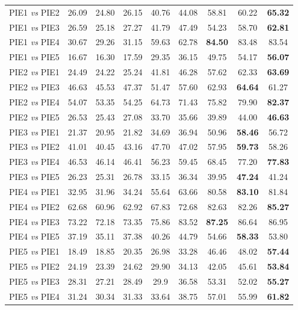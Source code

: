 \documentclass[10pt,twocolumn,letterpaper]{article}
\begin{document}
\begin{CJK*}{UTF8}{gkai}
\begin{table}[h!]
{\begin{tabular}{|l |c |c |c| c |c |c | c| c|}
			\vspace{1pt}  
			
			PIE1 \emph{vs} PIE2&  26.09&	24.80&	26.15&	40.76&	44.08&	58.81&	60.22&	\textbf{ 65.32}
			\\
			PIE1 \emph{vs} PIE3&  26.59&	25.18&	27.27&	41.79&	47.49&	54.23&	58.70&  \textbf{   62.81}
			\\
			PIE1 \emph{vs} PIE4 & 30.67&29.26&	31.15&	59.63&	62.78&\textbf{84.50}& 83.48& 83.54
			\\
			PIE1 \emph{vs} PIE5&   16.67&	16.30&	17.59&	29.35&	36.15&	49.75&	54.17&	\textbf{ 56.07}
			\\
			PIE2 \emph{vs} PIE1&   24.49&	24.22&	25.24&	41.81&	46.28&	57.62&	62.33&	\textbf{ 63.69}
			\\
			PIE2 \emph{vs} PIE3&   46.63&	45.53&	47.37&	51.47&	57.60&	62.93&	\textbf{ 64.64}&	61.27
			\\
			PIE2 \emph{vs} PIE4&   54.07&	53.35&	54.25&	64.73&	71.43&	75.82&	79.90	&\textbf{ 82.37}
			\\
			PIE2 \emph{vs} PIE5&   26.53&	25.43&	27.08&	33.70&	35.66&	39.89&	44.00&	\textbf{ 46.63}
			\\
			PIE3 \emph{vs} PIE1&   21.37&	20.95&	21.82&	34.69&	36.94&	50.96&	\textbf{ 58.46}&	56.72
			\\
			PIE3 \emph{vs} PIE2&   41.01&	40.45&	43.16&	47.70&	47.02&	57.95&	\textbf{ 59.73}&	58.26
			\\
			PIE3 \emph{vs} PIE4&   46.53&	46.14&	46.41&	56.23&	59.45&	68.45&	77.20&	\textbf{ 77.83}
			\\
			PIE3 \emph{vs} PIE5&   26.23&	25.31&	26.78&	33.15&	36.34&	39.95&	\textbf{ 47.24}&	41.24
			\\
			PIE4 \emph{vs} PIE1&   32.95&	31.96&	34.24&	55.64&	63.66&	80.58&	\textbf{ 83.10}&	81.84
			\\
			PIE4 \emph{vs} PIE2&  62.68&	60.96&	62.92&	67.83&	72.68&	82.63&	82.26&	\textbf{ 85.27}
			\\
			PIE4 \emph{vs} PIE3&   73.22&	72.18&	73.35&	75.86&	83.52&	\textbf{87.25}&	86.64&	86.95
			\\
			PIE4 \emph{vs} PIE5&   37.19&	35.11&	37.38&	40.26&	44.79&	54.66&	\textbf{ 58.33}&	53.80
			\\
			PIE5 \emph{vs} PIE1&  18.49&	18.85&	20.35&	26.98&	33.28&	46.46&	48.02&	\textbf{ 57.44}
			\\
			PIE5 \emph{vs} PIE2&   24.19&	23.39&	24.62&	29.90&	34.13&	42.05&	45.61&	\textbf{ 53.84}
			\\
			PIE5 \emph{vs} PIE3&  28.31&	27.21&	28.49&	29.9&	36.58&	53.31&	52.02&	\textbf{ 55.27}
			\\
			PIE5 \emph{vs} PIE4&   31.24&	30.34&	31.33&	33.64&	38.75&	57.01&	55.99&	\textbf{ 61.82}
			\\
			\hline
			

\end{tabular}}
\end{table}
\end{CJK*}
\end{document}
